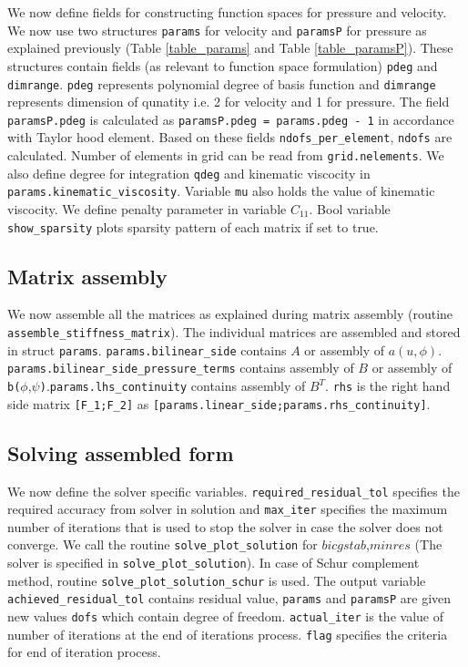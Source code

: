 \documentclass[a4paper,openany]{book}
\begin{document}
We now define fields for constructing function spaces for pressure and velocity. We now use two structures \verb|params| for velocity and \verb|paramsP| for pressure as explained previously (Table \ref{table_params} and Table \ref{table_paramsP}). These structures contain fields (as relevant to function space formulation) \verb|pdeg| and \verb|dimrange|. \verb|pdeg| represents polynomial degree of basis function and \verb|dimrange| represents  dimension of qunatity i.e. 2 for velocity and 1 for pressure. The field \verb|paramsP.pdeg| is calculated as \verb|paramsP.pdeg = params.pdeg - 1| in accordance with Taylor hood element. Based on these fields \verb|ndofs_per_element|, \verb|ndofs| are calculated. Number of elements in grid can be read from \verb|grid.nelements|. We also define degree for integration \verb|qdeg| and kinematic viscocity in \verb|params.kinematic_viscosity|. Variable \verb|mu| also holds the value of kinematic viscocity. We define penalty parameter in variable $C_{11}$. Bool variable \verb|show_sparsity| plots sparsity pattern of each matrix if set to true.\\

\subsection{Matrix assembly}

We now assemble all the matrices as explained during matrix assembly (routine \verb|assemble_stiffness_matrix|). The individual matrices are assembled and stored in struct \verb|params|. \verb|params.bilinear_side| contains $A$ or assembly of $a(u,\phi)$. \verb|params.bilinear_side_pressure_terms| contains assembly of $B$ or assembly of \verb|b(|$\phi$,$\psi$\verb|)|.\verb|params.lhs_continuity| contains assembly of $B^T$. \verb|rhs| is the right hand side matrix \verb|[F_1;F_2]| as \verb|[params.linear_side;params.rhs_continuity]|. \\

\subsection{Solving assembled form}

We now define the solver specific variables. \verb|required_residual_tol| specifies the required accuracy from solver in solution and \verb|max_iter| specifies the maximum number of iterations that is used to stop the solver in case the solver does not converge. We call the routine \verb|solve_plot_solution| for $bicgstab$,$minres$ (The solver is specified in \verb|solve_plot_solution|). In case of Schur complement method, routine \verb|solve_plot_solution_schur| is used. The output variable \verb|achieved_residual_tol| contains residual value, \verb|params| and \verb|paramsP| are given new values \verb|dofs| which contain degree of freedom. \verb|actual_iter| is the value of number of iterations at the end of iterations process. \verb|flag| specifies the criteria for end of iteration process.\\
\end{document}
